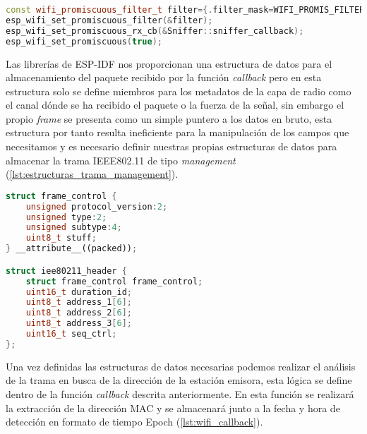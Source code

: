 \documentclass[../proyecto.tex]{subfiles}
\begin{document}
\begin{minipage}{\linewidth}
\begin{lstlisting}[language=C++, caption=Activación del modo promiscuo con filtrado, captionpos=b, frame=single]
const wifi_promiscuous_filter_t filter={.filter_mask=WIFI_PROMIS_FILTER_MASK_MGMT};
esp_wifi_set_promiscuous_filter(&filter);
esp_wifi_set_promiscuous_rx_cb(&Sniffer::sniffer_callback);
esp_wifi_set_promiscuous(true);
\end{lstlisting}
\end{minipage}

Las librerías de ESP-IDF nos proporcionan una estructura de datos para el almacenamiento del paquete recibido por la función \textit{callback} pero en esta estructura solo se define miembros para los metadatos de la capa de radio como el canal dónde se ha recibido el paquete o la fuerza de la señal, sin embargo el propio \textit{frame} se presenta como un simple puntero a los datos en bruto, esta estructura por tanto resulta ineficiente para la manipulación de los campos que necesitamos y es necesario definir nuestras propias estructuras de datos para almacenar la trama IEEE802.11 de tipo \textit{management} (\autoref{lst:estructuras_trama_management}).\\

\begin{lstlisting}[language=C++, caption=Estructuras de datos para almacenamiento de las cabeceras IEEE802.11 , captionpos=b, frame=single, label={lst:estructuras_trama_management}]
struct frame_control {
    unsigned protocol_version:2;
    unsigned type:2;
    unsigned subtype:4;
    uint8_t stuff;
} __attribute__((packed));

struct iee80211_header {
    struct frame_control frame_control;
    uint16_t duration_id;
    uint8_t address_1[6];
    uint8_t address_2[6];
    uint8_t address_3[6];
    uint16_t seq_ctrl;
};
\end{lstlisting}

Una vez definidas las estructuras de datos necesarias podemos realizar el análisis de la trama en busca de la dirección de la estación emisora, esta lógica se define dentro de la función \textit{callback} descrita anteriormente. En esta función se realizará la extracción de la dirección MAC y se almacenará junto a la fecha y hora de detección en formato de tiempo Epoch (\autoref{lst:wifi_callback}).\\
\end{document}
